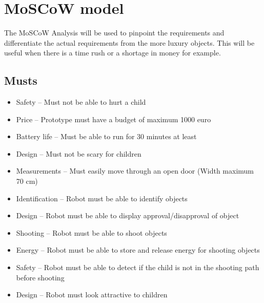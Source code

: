 \documentclass[11pt,twoside,a4paper]{report}
\begin{document}
\begin{appendices}
\begin{usecase}
\end{usecase}

\begin{usecase}
\end{usecase}
\label{appendix:usecase}

\chapter{MoSCoW model}
The MoSCoW Analysis will be used to pinpoint the requirements and differentiate the actual requirements from the more luxury objects. This will be useful when there is a time rush or a shortage in money for example.
\label{appendix:moscow}
\section*{Musts}
\begin{itemize}
\item Safety --         Must not be able to hurt a child
\item Price --             Prototype must have a budget of maximum 1000 euro
\item Battery life --         Must be able to run for 30 minutes at least
\item Design --        Must not be scary for children
\item Measurements --     Must easily move through an open door (Width maximum 70 cm)
\item Identification --        Robot must be able to identify objects
\item Design --       Robot must be able to display approval/disapproval of object
\item Shooting --        Robot must be able to shoot objects
\item Energy --         Robot must be able to store and release energy for shooting objects
\item Safety --        Robot must be able to detect if the child is not in the shooting path before shooting
\item Design --         Robot must look attractive to children
\end{itemize}

\end{appendices}
\end{document}
